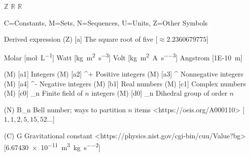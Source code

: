 
\DeclareMathOperator{\indicator} {\mathbf{1}}
\DeclareMathOperator{\mean} {mean}
\DeclareMathOperator{\std} {std}
\DeclareMathOperator{\sgn} {sgn}
\NewDocumentCommand \Z {} { \ensuremath{\mathbb{Z}} }
\NewDocumentCommand \R {} { \ensuremath{\mathbb{R}} }
\NewDocumentCommand \C {} { \ensuremath{\mathbb{R}} }

\DeclareSIQualifier{}  %
\DeclareSIQualifier{}
\DeclareSIUnit{}
\DeclareSIUnit{}
\DeclareSIUnit{}
\DeclareSIUnit\angstrom{\AA}



\SetNomGroups
{
    C=Constants,
    M=Sets,
    N=Sequences,
    U=Units,
    Z=Other Symbols
}



     {Derived expression}
\NomMath (Z) [a] {} {The square root of five} [$\approx 2.2360679775$]


 {Molar} [\unit{\mol\per\liter}]
 {Watt} [\unit{\kilogram \meter \squared \per \second \cubed}]
 {Volt} [\unit{\kilogram \meter \squared \per \ampere \per \second \cubed}]
\NomUnit{\AA} {Angstrom} [\qty{1E-10} {\meter}]

\NomMath(M) [a1] {\Z} {Integers}
\NomMath(M) [a2] {\Z^+} {Positive integers}
\NomMath(M) [a3] {\Z^{}} {Nonnegative integers}
\NomMath(M) [a4] {\Z^-} {Negative integers}
\NomMath(M) [b1] {\Z} {Real numbers}
\NomMath(M) [c1] {\C} {Complex numbers}
\NomMath(M) [c0] {\Z_n} {Finite field of $n$ integers}
\NomMath(M) [d0] {_n} {Dihedral group of order $n$}

\NomMath (N) {B_n} {Bell number; ways to partition $n$ items}
    <https://oeis.org/A000110>
    [$1, 1, 2, 5, 15, 52 \ldots$]

\NomMath (C) {G} {Gravitational constant}
    <https://physics.nist.gov/cgi-bin/cuu/Value?bg>
    [\qty{6.67430e-11}{\meter\cubed\per\kilogram\per\second\squared}]

